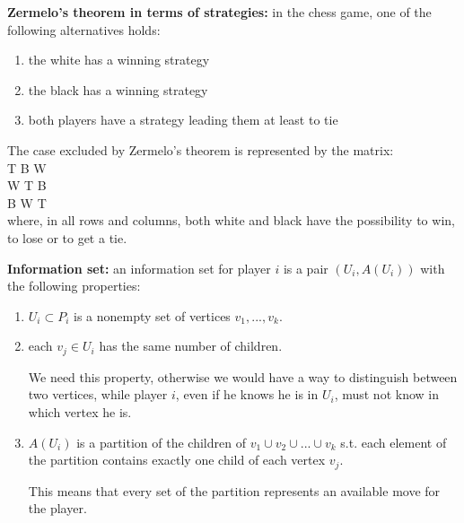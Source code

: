 \bigskip
\noindent \textbf{Zermelo's theorem in terms of strategies:} in the chess game, 
one of the following alternatives holds:
\begin{enumerate}
	\item the white has a winning strategy
	\item the black has a winning strategy
	\item both players have a strategy leading them at least to tie
\end{enumerate}
The case excluded by Zermelo's theorem is represented by the matrix:\\
T \hspace{.6cm} B \hspace{.6cm}	W\\
W \hspace{.6cm} T \hspace{.6cm} B\\
B \hspace{.6cm}	W \hspace{.6cm}	T\\
where, in all rows and columns, both white and black have the possibility to 
win, to lose or to get a tie.

\bigskip
\noindent \textbf{Information set:} an information set for player $i$ is a pair 
$(U_i,A(U_i))$ with the following properties:
\begin{enumerate}
	\item $U_i \subset P_i$ is a nonempty set of vertices $v_1,...,v_k$.
	\item each $v_j \in U_i$ has the same number of children.

	\noindent We need this property, otherwise we would have a way to 
	distinguish between two vertices, while player $i$, even if he knows he is 
	in $U_i$, must not know in which vertex he is.

	\item $A(U_i)$ is a partition of the children of $v_1 \cup v_2 \cup ... 
	\cup v_k$ s.t. each element of the partition contains exactly one child of 
	each vertex $v_j$.

	\noindent This means that every set of the partition represents an available 
	move for the player.
\end{enumerate}


